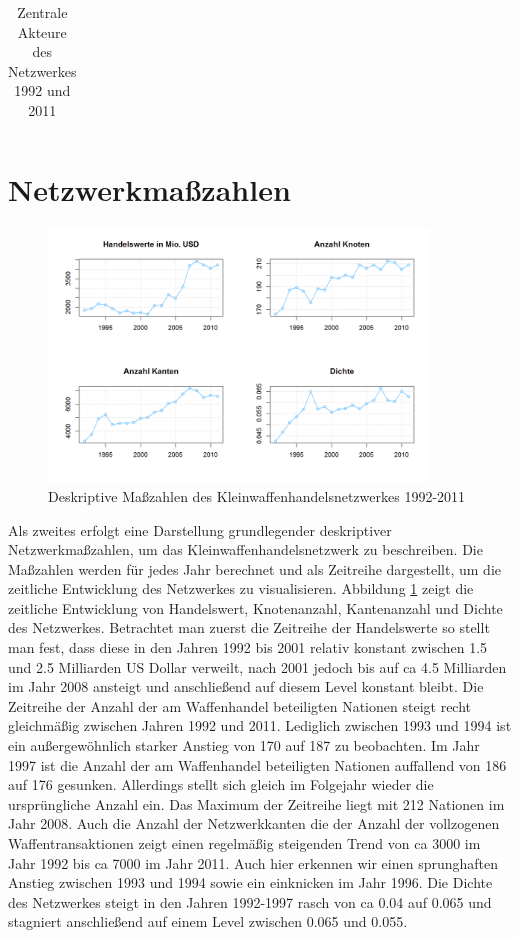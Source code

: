 \documentclass[a4paper,ngerman,oneside,titlepage,bibliography=totoc,11pt]{scrreprt}
\begin{document}
\begin{table}[ht]
\begin{minipage}[t]{0.48\textwidth}
\begin{tabular}{rlr}
\end{tabular}
\end{minipage}
\caption{Zentrale Akteure des Netzwerkes  1992 und 2011} 
\label{tab:ZentrAkt}
	\end{table}



\section{Netzwerkmaßzahlen}
\begin{figure}[ht]
	\centering
		\includegraphics[width=0.9\textwidth]{Grafiken/ts_descriptives.png}
	\caption{Deskriptive Maßzahlen des Kleinwaffenhandelsnetzwerkes 1992-2011}
	\label{fig:ts_descriptives}
\end{figure}
Als zweites erfolgt eine Darstellung grundlegender deskriptiver Netzwerkmaßzahlen, um das Kleinwaffenhandelsnetzwerk zu beschreiben. Die Maßzahlen werden für jedes Jahr berechnet und als Zeitreihe dargestellt, um die zeitliche Entwicklung des Netzwerkes zu visualisieren. 
Abbildung \ref{fig:ts_descriptives} zeigt die zeitliche Entwicklung  von Handelswert, Knotenanzahl, Kantenanzahl und Dichte des Netzwerkes. Betrachtet man zuerst die Zeitreihe der Handelswerte so stellt man fest, dass diese in den Jahren 1992 bis 2001 relativ konstant zwischen 1.5 und 2.5 Milliarden US Dollar verweilt, nach 2001 jedoch bis auf ca 4.5 Milliarden im Jahr 2008 ansteigt und anschließend auf diesem Level konstant bleibt.
Die Zeitreihe der Anzahl der am Waffenhandel beteiligten Nationen steigt recht gleichmäßig zwischen Jahren 1992 und 2011. Lediglich zwischen 1993 und 1994 ist ein außergewöhnlich starker Anstieg von 170 auf 187 zu beobachten. Im Jahr 1997 ist die Anzahl der am Waffenhandel beteiligten Nationen auffallend von 186 auf 176 gesunken. Allerdings stellt sich gleich im Folgejahr wieder die ursprüngliche Anzahl ein. Das Maximum der Zeitreihe liegt mit 212 Nationen im Jahr 2008.
Auch die Anzahl der Netzwerkkanten die der Anzahl der vollzogenen Waffentransaktionen zeigt einen regelmäßig steigenden Trend von ca 3000 im Jahr 1992 bis ca 7000 im Jahr 2011. Auch hier erkennen wir einen sprunghaften Anstieg zwischen 1993 und 1994 sowie ein einknicken im Jahr 1996.
Die Dichte des Netzwerkes steigt in den Jahren 1992-1997 rasch von ca 0.04 auf 0.065 und stagniert anschließend auf einem Level zwischen 0.065 und 0.055.
\end{document}
